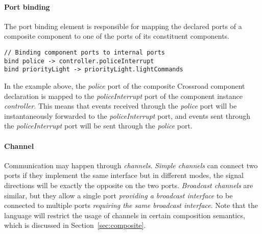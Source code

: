 \paragraph{Port binding} The port binding element is responsible for mapping the declared ports of a composite component to one of the ports of its constituent components.


\begin{lstlisting}
// Binding component ports to internal ports
bind police -> controller.policeInterrupt
bind priorityLight -> priorityLight.lightCommands
\end{lstlisting}

In the example above, the \emph{police} port of the composite Crossroad component declaration is mapped to the \emph{policeInterrupt} port of the component instance \emph{controller}. This means that events received through the \emph{police} port will be instantaneously forwarded to the \emph{policeInterrupt} port, and events sent through the \emph{policeInterrupt} port will be sent through the \emph{police} port.

\paragraph{Channel} 
Communication may happen through \emph{channels}. \emph{Simple channels} can connect two ports if they implement the same interface but in different modes, \ie the signal directions will be exactly the opposite on the two ports. \emph{Broadcast channels} are similar, but they allow a single port \emph{providing a broadcast interface} to be connected to multiple ports \emph{requiring the same broadcast interface}. Note that the language will restrict the usage of channels in certain composition semantics, which is discussed in Section~\ref{sec:composite}.

